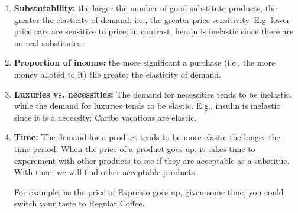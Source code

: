 \begin{enumerate}[label = \textbf{(\Alph*)}, itemsep = 1em]
\begin{enumerate}[label = \textbf{(\arabic*)}, itemsep = 1ex]
				\begin{enumerate}[label = \textbullet, itemsep = 1ex, topsep = 1ex]
					\item \textbf{Substutability:} the larger the number of good substitute products, the greater the elasticity of demand, i.e., the greater price sensitivity. E.g. lower price cars are sensitive to price; in contrast, heroin is inelastic since there are no real substitutes.
					\item \textbf{Proportion of income:} the more significant a purchase (i.e., the more money alloted to it) the greater the elasticity of demand.
					\item \textbf{Luxuries vs. necessities:} The demand for necessities tends to be inelastic, while the demand for luxuries tends to be elastic. E.g., insulin is inelastic since it is a necessity; Caribe vacations are elastic.
					\item \textbf{Time:} The demand for a product tends to be more elastic the longer the time period. When the price of a product goes up, it takes time to experement with other products to see if they are acceptable as a substitue. With time, we will find other acceptable products.

						For example, as the price of Expresso goes up, given some time, you could switch your taste to Regular Coffee.
				\end{enumerate}
		\end{enumerate}

\end{enumerate}

